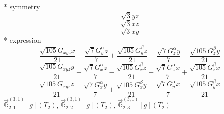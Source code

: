 \documentclass[fleqn,8pt]{jsarticle}
\begin{document}
\noindent\quad ** symmetry
\begin{dmath*}
\sqrt{3} y z
\end{dmath*}
\begin{dmath*}
\sqrt{3} x z
\end{dmath*}
\begin{dmath*}
\sqrt{3} x y
\end{dmath*}
\noindent\quad ** expression
\begin{dmath*}
\frac{\sqrt{105} G_{xyz} x}{21} - \frac{\sqrt{7} G_{y}^{\alpha} z}{7} + \frac{\sqrt{105} G_{y}^{\beta} z}{21} - \frac{\sqrt{7} G_{z}^{\alpha} y}{7} - \frac{\sqrt{105} G_{z}^{\beta} y}{21}
\end{dmath*}
\begin{dmath*}
\frac{\sqrt{105} G_{xyz} y}{21} - \frac{\sqrt{7} G_{x}^{\alpha} z}{7} - \frac{\sqrt{105} G_{x}^{\beta} z}{21} - \frac{\sqrt{7} G_{z}^{\alpha} x}{7} + \frac{\sqrt{105} G_{z}^{\beta} x}{21}
\end{dmath*}
\begin{dmath*}
\frac{\sqrt{105} G_{xyz} z}{21} - \frac{\sqrt{7} G_{x}^{\alpha} y}{7} + \frac{\sqrt{105} G_{x}^{\beta} y}{21} - \frac{\sqrt{7} G_{y}^{\alpha} x}{7} - \frac{\sqrt{105} G_{y}^{\beta} x}{21}
\end{dmath*}
\noindent\quad $\vec{\mathbb{G}}_{2,1}^{(3,1)}[g](T_{2})$, $\vec{\mathbb{G}}_{2,2}^{(3,1)}[g](T_{2})$, $\vec{\mathbb{G}}_{2,3}^{(3,1)}[g](T_{2})$
\end{document}
